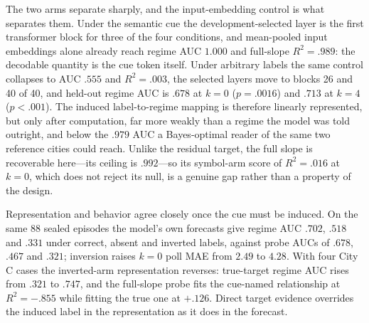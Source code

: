\begin{center}
\begin{minipage}{\linewidth}
\centering
{}
\label{tab:coin-city-probe-power}
\scriptsize
\setlength{\tabcolsep}{3.2pt}
\resizebox{\linewidth}{!}{}
\end{minipage}
\end{center}

The two arms separate sharply, and the input-embedding control is what separates
them. Under the semantic cue the development-selected layer is the first
transformer block for three of the four conditions, and mean-pooled input
embeddings alone already reach regime AUC $1.000$ and full-slope $R^2=.989$: the
decodable quantity is the cue token itself. Under arbitrary labels the same control
collapses to AUC $.555$ and $R^2=.003$, the selected layers move to blocks 26 and
40 of 40, and held-out regime AUC is $.678$ at $k=0$ ($p=.0016$) and $.713$ at
$k=4$ ($p<.001$). The induced label-to-regime mapping is therefore linearly
represented, but only after computation, far more weakly than a regime the model
was told outright, and below the $.979$ AUC a Bayes-optimal reader of the same two
reference cities could reach. Unlike the residual target, the full slope is
recoverable here---its ceiling is $.992$---so its symbol-arm score of $R^2=.016$ at
$k=0$, which does not reject its null, is a genuine gap rather than a property of
the design.

Representation and behavior agree closely once the cue must be induced. On the same
88 sealed episodes the model's own forecasts give regime AUC $.702$, $.518$ and
$.331$ under correct, absent and inverted labels, against probe AUCs of $.678$,
$.467$ and $.321$; inversion raises $k=0$ poll MAE from $2.49$ to $4.28$. With four
City C cases the inverted-arm representation reverses: true-target regime AUC rises
from $.321$ to $.747$, and the full-slope probe fits the cue-named relationship at
$R^2=-.855$ while fitting the true one at $+.126$. Direct target evidence overrides
the induced label in the representation as it does in the forecast.

